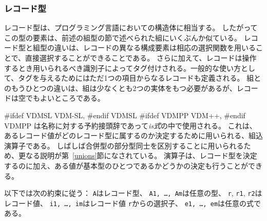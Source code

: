 \documentclass[\pformat,12pt]{jarticle}
\newcommand{\vdmslpp}[2]{%
#ifdef VDMSL
#1
#endif VDMSL
#ifdef VDMPP
#2
#endif VDMPP
}
\newcommand{\vdmsl}{VDM-SL}
\newcommand{\vdmpp}{VDM++}
\begin{document}
\subsubsection{レコード型}\label{records}

レコード型は、プログラミング言語においての構造体に相当する。
したがってこの型の要素は、前述の組型の節で述べられた組にいくぶんか似ている。
レコード型と組型の違いは、レコードの異なる構成要素は相応の選択関数を用いることで、直接選択することができることである。 
さらに加えて、レコードは操作するとき用いられるべき識別子によってタグ付けされる。一般的な使い方として、タグを与えるためにはただ1つの項目からなるレコードも定義される。
組とのもうひとつの違いは、組は少なくとも2つの実体をもつ必要があるが、レコードは空でもよいところである。

\vdmslpp{\vdmsl,}{\vdmpp,}  は名称に対する予約接頭辞であって{\it is式}の中で使用される。 
これは、あるレコード値がどのレコード型に属するのか決定するために用いられる、組込演算子である。
しばしば合併型の部分型同士を区別することに用いられるため、更なる説明が第~\ref{unions}節になされている。 
演算子は、レコード型を決定するのに加え、ある値が基本型のひとつであるかどうかの決定も行うことができる。
 
以下では次の約束に従う： {\tt A}はレコード型、 {\tt A1, \ldots, Am}は任意の型、 {\tt r}, {\tt r1}, {\tt r2}はレコード値、 {\tt i1, \ldots, im}はレコード値 {\tt r}からの選択子、 {\tt e1, \ldots, em}は任意の式である。
\end{document}
